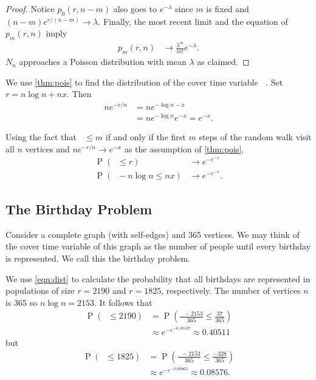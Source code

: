 \documentclass[12pt]{article}
\theoremstyle{definition}
\DeclareMathOperator{\pr}{\mathrm{P}}		     %
\DeclareMathOperator{\cov}{\uptau_\textrm{cov}}  %
\begin{document}
\begin{proof}
Notice $p_0(r,n-m)$ also goes to $e^{-\lambda}$
since $m$ is fixed and $(n-m)e^{r/(n-m)} \rightarrow \lambda$.
Finally, the most recent limit and the equation of $p_m(r,n)$ imply
\begin{align}
p_m(r,n) 
&\rightarrow \frac{\lambda^m}{ m!} e^{-\lambda} \nonumber.
\end{align}
$N_n$ approaches a Poisson distribution with mean $\lambda$ as claimed.

\end{proof}


We use \cref{thm:pois} to find the distribution of the cover time variable $\cov$.
Set $r = n \log n + nx$.
Then 
\begin{align}
ne^{-r/n} &= n e ^{- \log n - x} \nonumber \\
&= n e^{- \log n} e^ {- x} = e^{-x}.\nonumber
\end{align}

Using the fact that $\cov \leq m$ if and only if the first $m$ steps
of the random walk visit all $n$ vertices
and $ne^{-r/n} \rightarrow e^{-x}$ as the assumption of \cref{thm:pois},
\begin{align}
\pr(\cov \leq r) &\rightarrow e^{-e^{-x}} \nonumber \\
\pr(\cov - n \log n\leq nx) &\rightarrow e^{-e^{-x}}. \label{eqn:dist}
\end{align}

\subsection{The Birthday Problem}\label{sec:birthday}
Consider a complete graph (with self-edges) and 365 vertices.
We may think of the cover time variable of this graph as the number of people
until every birthday is represented.
We call this the birthday problem.

We use \cref{eqn:dist} to calculate the probability
that all birthdays are represented in populations of 
size $r=2190$ and $r=1825$, respectively.
The number of vertices $n$ is 365 so $n\log n = 2153$.
It follows that
\begin{align}
\pr(\cov \leq 2190) &= \pr \left(\frac{\cov - 2153}{365} \leq
\frac{37}{365}\right) \nonumber \\
&\approx e^{-e^{-0.10137}} \approx 0.40511 \nonumber
\end{align}
but 
\begin{align}
\pr(\cov \leq 1825) &= \pr \left(\frac{\cov - 2153}{365} \leq
\frac{-328}{365}\right) \nonumber \\
&\approx e^{-e^{-0.89863}} \approx 0.08576. \nonumber
\end{align}
\end{document}
